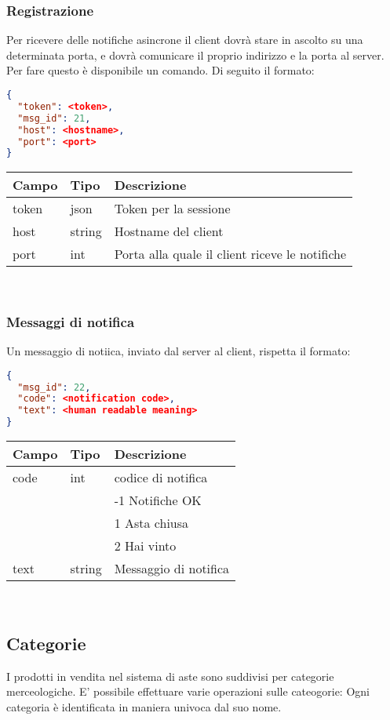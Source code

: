 \subsubsection{Registrazione}
Per ricevere delle notifiche asincrone il client dovrà stare in ascolto su una determinata porta, e dovrà comunicare il proprio indirizzo e la porta al server. Per fare questo è disponibile un comando. Di seguito il formato:\\
\begin{lstlisting}[language=json]
{
  "token": <token>,
  "msg_id": 21,
  "host": <hostname>,
  "port": <port>
}
\end{lstlisting}

\begin{tabular}{|l | l | l |}
\hline
Campo & Tipo & Descrizione \\ \hline
token & json & Token per la sessione \\ \hline
host & string & Hostname del client  \\ \hline
port & int & Porta alla quale il client riceve le notifiche  \\ \hline
\end{tabular} \\
\subsubsection{Messaggi di notifica}
Un messaggio di notiica, inviato dal server al client, rispetta il formato:
\begin{lstlisting}[language=json]
{
  "msg_id": 22,
  "code": <notification code>,
  "text": <human readable meaning>
}
\end{lstlisting}
\begin{tabular}{|l | l | l |}
\hline
Campo & Tipo & Descrizione \\ \hline
code & int & codice di notifica \\
& & -1 Notifiche OK \\ \hline
& & 1 Asta chiusa\\
& & 2 Hai vinto\\ \hline
text & string & Messaggio di notifica \\ \hline
\end{tabular} \\


\subsection{Categorie}
I prodotti in vendita nel sistema di aste sono suddivisi per categorie merceologiche. E' possibile effettuare varie operazioni sulle cateogorie:
Ogni categoria è identificata in maniera univoca dal suo nome.
